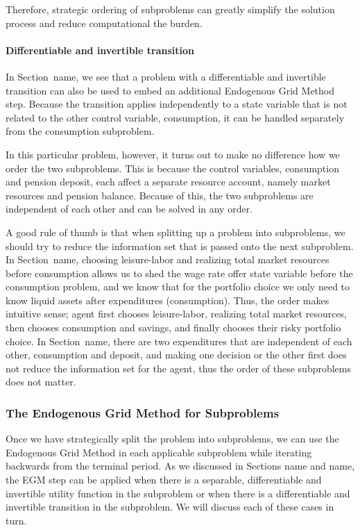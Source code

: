 \documentclass{article}
\begin{document}
Therefore, strategic ordering of subproblems can greatly simplify the solution process and reduce computational the burden.

\paragraph{Differentiable and invertible transition}\label{Differentiable and invertible transition}

In Section~{name}, we see that a problem with a differentiable and invertible transition can also be used to embed an additional Endogenous Grid Method step. Because the transition applies independently to a state variable that is not related to the other control variable, consumption, it can be handled separately from the consumption subproblem.

In this particular problem, however, it turns out to make no difference how we order the two subproblems. This is because the control variables, consumption and pension deposit, each affect a separate resource account, namely market resources and pension balance. Because of this, the two subproblems are independent of each other and can be solved in any order.

A good rule of thumb is that when splitting up a problem into subproblems, we should try to reduce the information set that is passed onto the next subproblem. In Section~{name}, choosing leisure-labor and realizing total market resources before consumption allows us to shed the wage rate offer state variable before the consumption problem, and we know that for the portfolio choice we only need to know liquid assets after expenditures (consumption). Thus, the order makes intuitive sense; agent first chooses leisure-labor, realizing total market resources, then chooses consumption and savings, and finally chooses their risky portfolio choice. In Section~{name}, there are two expenditures that are independent of each other, consumption and deposit, and making one decision or the other first does not reduce the information set for the agent, thus the order of these subproblems does not matter.

\subsubsection{The Endogenous Grid Method for Subproblems}\label{The Endogenous Grid Method for Subproblems}

Once we have strategically split the problem into subproblems, we can use the Endogenous Grid Method in each applicable subproblem while iterating backwards from the terminal period. As we discussed in Sections {name} and {name}, the EGM step can be applied when there is a separable, differentiable and invertible utility function in the subproblem or when there is a differentiable and invertible transition in the subproblem. We will discuss each of these cases in turn.
\end{document}
